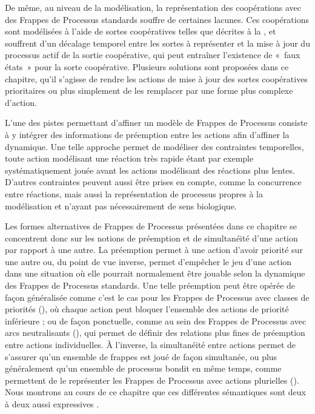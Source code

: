 De même, au niveau de la modélisation, la représentation des coopérations avec des Frappes de
Processus standards souffre de certaines lacunes.
Ces coopérations sont modélisées à l'aide de sortes coopératives telles que décrites à la ,
et souffrent d'un décalage temporel entre les sortes à représenter et
la mise à jour du processus actif de la sortie coopérative,
qui peut entraîner l'existence de «~faux états~» pour la sorte coopérative.
Plusieurs solutions sont proposées dans ce chapitre, qu'il s'agisse de rendre les actions de mise à
jour des sortes coopératives prioritaires ou plus simplement de les remplacer par une forme plus
complexe d'action.

L'une des pistes permettant d'affiner un modèle de Frappes de Processus consiste à y intégrer
des informations de préemption entre les actions afin d'affiner la dynamique.
Une telle approche permet de modéliser des contraintes temporelles,
toute action modélisant une réaction très rapide étant par exemple systématiquement jouée
avant les actions modélisant des réactions plus lentes.
D'autres contraintes peuvent aussi être prises en compte, comme la concurrence entre réactions,
mais aussi la représentation de processus propres à la modélisation et n'ayant pas nécessairement
de sens biologique.

Les formes alternatives de Frappes de Processus présentées dans ce chapitre se concentrent donc
sur les notions de préemption et de simultanéité d'une action par rapport à une autre.
La préemption permet à une action d'avoir priorité sur une autre ou, du point de vue inverse,
permet d'empêcher le jeu d'une action dans une situation où elle pourrait normalement être jouable
selon la dynamique des Frappes de Processus standards.
Une telle préemption peut être opérée de façon généralisée
comme c'est le cas pour les Frappes de Processus avec classes de priorités (),
où chaque action peut bloquer l'ensemble des actions de priorité inférieure ;
ou de façon ponctuelle, comme au sein des Frappes de Processus avec arcs neutralisants (),
qui permet de définir des relations plus fines de préemption entre actions individuelles.
À l'inverse, la simultanéité entre actions permet de s'assurer qu'un ensemble de frappes est joué
de façon simultanée, ou plus généralement qu'un ensemble de processus bondit en même temps,
comme permettent de le représenter les Frappes de Processus avec actions plurielles ().
Nous montrons au cours de ce chapitre que ces différentes sémantiques sont deux à deux aussi
expressives .

